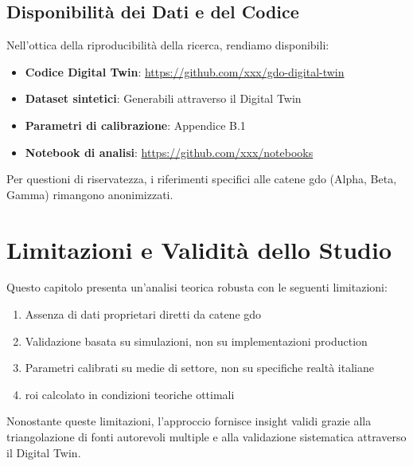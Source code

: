 

\subsection*{Disponibilità dei Dati e del Codice}

Nell'ottica della riproducibilità della ricerca, rendiamo disponibili:
\begin{itemize}
    \item \textbf{Codice Digital Twin}: \url{https://github.com/xxx/gdo-digital-twin}
    \item \textbf{Dataset sintetici}: Generabili attraverso il Digital Twin
    \item \textbf{Parametri di calibrazione}: Appendice B.1
    \item \textbf{Notebook di analisi}: \url{https://github.com/xxx/notebooks}
\end{itemize}

Per questioni di riservatezza, i riferimenti specifici alle catene 
\gls{gdo} (Alpha, Beta, Gamma) rimangono anonimizzati.

\section{\texorpdfstring{Limitazioni e Validità dello Studio}{2.8 - Limitazioni e Validità dello Studio}}

Questo capitolo presenta un'analisi teorica robusta con le seguenti limitazioni:
\begin{enumerate}
    \item Assenza di dati proprietari diretti da catene \gls{gdo}
    \item Validazione basata su simulazioni, non su implementazioni production
    \item Parametri calibrati su medie di settore, non su specifiche realtà italiane
    \item \gls{roi} calcolato in condizioni teoriche ottimali
\end{enumerate}

Nonostante queste limitazioni, l'approccio fornisce insight validi 
grazie alla triangolazione di fonti autorevoli multiple e alla 
validazione sistematica attraverso il Digital Twin.


